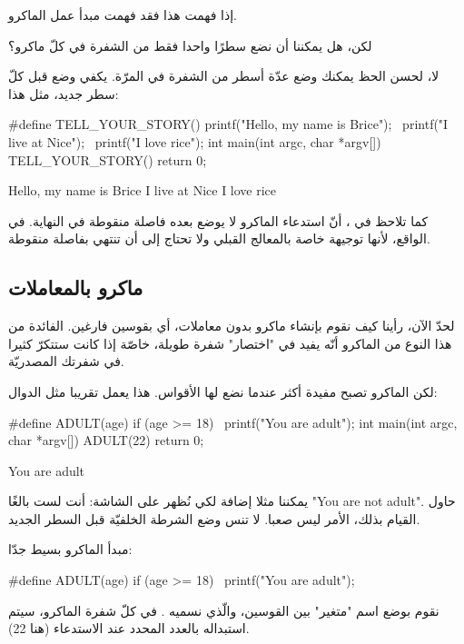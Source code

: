 إذا فهمت هذا فقد فهمت مبدأ عمل الماكرو.

\begin{question}
  لكن، هل يمكننا أن نضع سطرًا واحدا فقط من الشفرة في كلّ ماكرو؟
\end{question}

لا، لحسن الحظ يمكنك وضع عدّة أسطر من الشفرة في المرّة. يكفي وضع
\InlineCode{\textbackslash}
قبل كلّ سطر جديد، مثل هذا:

\begin{Csource}
#define TELL_YOUR_STORY() printf("Hello, my name is Brice\n"); \
                          printf("I live at Nice\n"); \
                          printf("I love rice\n");
int main(int argc, char *argv[])
{
	TELL_YOUR_STORY()
	return 0;
}
\end{Csource}

\begin{Console}
Hello, my name is Brice
I live at Nice
I love rice
\end{Console}

كما تلاحظ في
،
أنّ استدعاء الماكرو لا يوضع بعده فاصلة منقوطة في النهاية. في الواقع، لأنها توجيهة خاصة بالمعالج القبلي ولا تحتاج إلى  أن تنتهي بفاصلة منقوطة.

\subsection{ماكرو بالمعاملات}
لحدّ الآن، رأينا كيف نقوم بإنشاء ماكرو بدون معاملات، أي بقوسين فارغين. الفائدة من هذا النوع من الماكرو أنّه يفيد في "اختصار" شفرة طويلة، خاصّة إذا كانت ستتكرّ كثيرا في شفرتك المصدريّة.

لكن الماكرو تصبح مفيدة أكثر عندما نضع لها الأقواس. هذا يعمل تقريبا مثل الدوال:
\begin{Csource}
#define ADULT(age) if (age >= 18) \
                    printf("You are adult\n");
int main(int argc, char *argv[])
{
	ADULT(22)
	return 0;
}
\end{Csource}

\begin{Console}
You are adult
\end{Console}

\begin{information}
يمكننا مثلا إضافة 
لكي نُظهر على الشاشة: أنت لست بالغًا
"\textenglish{You are not adult}".
حاول القيام بذلك، الأمر ليس صعبا. لا تنس وضع الشرطة الخلفيّة
\InlineCode{\textbackslash}
قبل السطر الجديد.
\end{information}
مبدأ الماكرو بسيط جدّا:
\begin{Csource}
#define ADULT(age) if (age >= 18) \
                    printf("You are adult\n");
\end{Csource}
نقوم بوضع اسم "متغير" بين القوسين، والّذي نسميه
.
في كلّ شفرة الماكرو،
\InlineCode{age}
سيتم استبداله بالعدد المحدد عند الاستدعاء (هنا 22).

